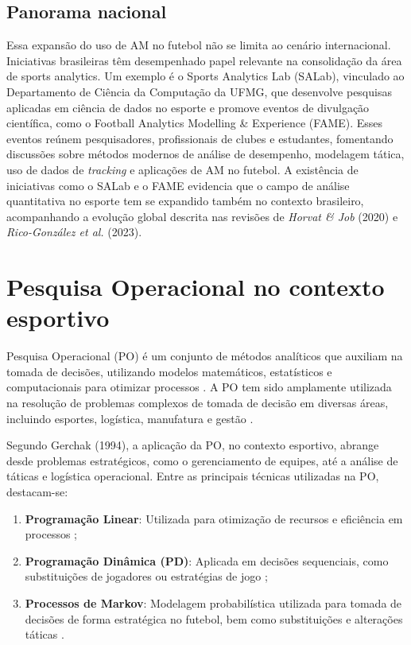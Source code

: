 \subsection{Panorama nacional}

Essa expansão do uso de AM no futebol não se limita ao cenário internacional. Iniciativas brasileiras têm desempenhado papel 
relevante na consolidação da área de sports analytics. Um exemplo é o Sports Analytics Lab (SALab), vinculado ao Departamento de Ciência da Computação da UFMG, que 
desenvolve pesquisas aplicadas em ciência de dados no esporte e promove eventos de divulgação científica, como o Football Analytics Modelling & Experience (FAME). 
Esses eventos reúnem pesquisadores, profissionais de clubes 
e estudantes, fomentando discussões sobre métodos modernos de análise de desempenho, modelagem tática, uso de dados de \textit{tracking} e aplicações de AM no futebol. 
A existência de iniciativas como o SALab e o FAME evidencia que o campo de análise quantitativa no esporte tem se expandido também no contexto brasileiro, acompanhando 
a evolução global descrita nas revisões de \textit{Horvat & Job} (2020) e \textit{Rico-González et al.} (2023).


\section{Pesquisa Operacional no contexto esportivo}

Pesquisa Operacional (PO) é um conjunto de métodos analíticos que auxiliam na tomada de decisões, utilizando modelos matemáticos, estatísticos e 
computacionais para otimizar processos \cite{Medri2009}. A PO tem sido amplamente utilizada na resolução de problemas complexos de tomada de decisão em diversas áreas, 
incluindo esportes, logística, manufatura e gestão \cite{Wright2009}.

Segundo Gerchak (1994), a aplicação da PO, no contexto esportivo, abrange desde problemas estratégicos, como o gerenciamento de equipes, até a análise de táticas e 
logística operacional.
Entre as principais técnicas utilizadas na PO, destacam-se:

\begin{enumerate}
    \item \textbf{Programação Linear}: Utilizada para otimização de recursos e eficiência em processos \cite{Medri2009}; 
    \item \textbf{Programação Dinâmica (PD)}: Aplicada em decisões sequenciais, como substituições de jogadores ou estratégias de jogo \cite{Clarke1998};
    \item \textbf{Processos de Markov}: Modelagem probabilística utilizada para tomada de decisões de forma estratégica no futebol, bem como substituições e 
    alterações táticas \cite{Hirotsu2002}.
\end{enumerate}

